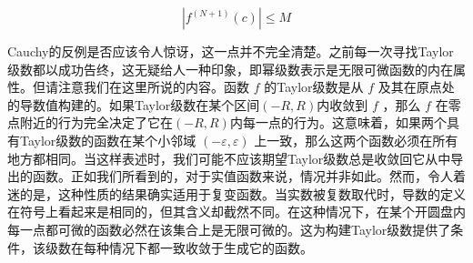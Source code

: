 \[
\left| {{f}^{\left( N + 1\right) }\left( c\right) }\right|  \leq  M
\]

Cauchy的反例是否应该令人惊讶，这一点并不完全清楚。之前每一次寻找Taylor级数都以成功告终，这无疑给人一种印象，即幂级数表示是无限可微函数的内在属性。但请注意我们在这里所说的内容。函数 \(f\) 的Taylor级数是从 \(f\) 及其在原点处的导数值构建的。如果Taylor级数在某个区间$(-R, R)$内收敛到 \(f\) ，那么 \(f\) 在零点附近的行为完全决定了它在$(-R, R)$内每一点的行为。这意味着，如果两个具有Taylor级数的函数在某个小邻域 \(\left( {-\varepsilon ,\varepsilon }\right)\) 上一致，那么这两个函数必须在所有地方都相同。当这样表述时，我们可能不应该期望Taylor级数总是收敛回它从中导出的函数。正如我们所看到的，对于实值函数来说，情况并非如此。然而，令人着迷的是，这种性质的结果确实适用于复变函数。当实数被复数取代时，导数的定义在符号上看起来是相同的，但其含义却截然不同。在这种情况下，在某个开圆盘内每一点都可微的函数必然在该集合上是无限可微的。这为构建Taylor级数提供了条件，该级数在每种情况下都一致收敛于生成它的函数。

